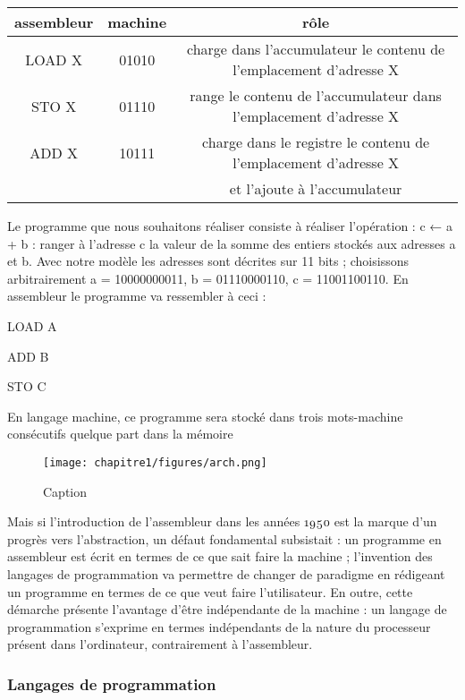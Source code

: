 \begin{tabular}{|c|c|c|}\hline
    assembleur &  machine&rôle\\\hline
    LOAD X & 01010&charge dans l’accumulateur le contenu de l’emplacement d’adresse X\\\hline
    STO X & 01110&range le contenu de l’accumulateur dans l’emplacement d’adresse X\\\hline
    ADD X & 10111&charge dans le registre le contenu de l’emplacement d’adresse X\\
     & &et l’ajoute à l’accumulateur\\ \hline
\end{tabular}

Le programme que nous souhaitons réaliser consiste à réaliser l’opération : c ← a + b : ranger à l’adresse c la
valeur de la somme des entiers stockés aux adresses a et b. Avec notre modèle les adresses sont décrites sur
11 bits ; choisissons arbitrairement a = 10000000011, b = 01110000110, c = 11001100110. En assembleur le
programme va ressembler à ceci :

LOAD A

ADD B

STO C

En langage machine, ce programme sera stocké dans trois mots-machine consécutifs quelque part dans la
mémoire
  
  \begin{figure}
      \centering
      \texttt{[image: chapitre1/figures/arch.png]}
      \caption{Caption}
      \label{fig:my_label}
  \end{figure}


Mais si l’introduction de l’assembleur dans les années  est la marque d’un progrès vers l’abstraction, un
défaut fondamental subsistait : un programme en assembleur est écrit en termes de ce que sait faire la machine ;
l’invention des langages de programmation va permettre de changer de paradigme en rédigeant un programme
en termes de ce que veut faire l’utilisateur. En outre, cette démarche présente l’avantage d’être indépendante
de la machine : un langage de programmation s’exprime en termes indépendants de la nature du processeur
présent dans l’ordinateur, contrairement à l’assembleur.

\subsubsection{Langages de programmation}
